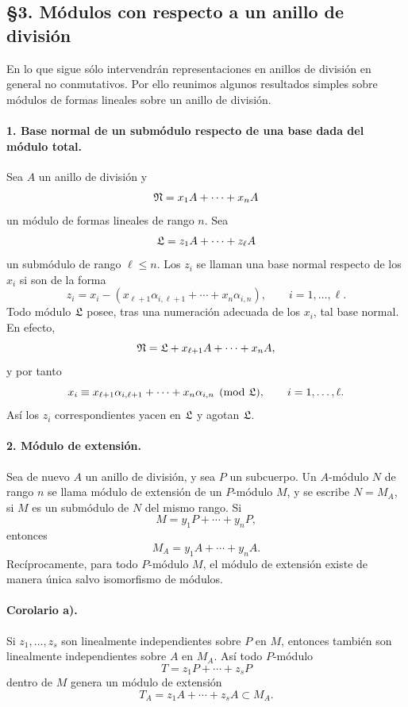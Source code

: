 \subsection*{§3. Módulos con respecto a un anillo de división}

En lo que sigue sólo intervendrán representaciones en anillos de división en general no conmutativos. Por ello reunimos algunos resultados simples sobre módulos de formas lineales sobre un anillo de división.

\paragraph{1. Base normal de un submódulo respecto de una base dada del módulo total.}
Sea \(A\) un anillo de división y
\[
        \mathfrak N=x_1A+\cdots+x_nA
\]
un módulo de formas lineales de rango \(n\). Sea
\[
        \mathfrak L=z_1A+\cdots+z_\ell A
\]
un submódulo de rango \(\ell\le n\). Los \(z_i\) se llaman una base normal respecto de los \(x_i\) si son de la forma
\[
        z_i=x_i-(x_{\ell+1}\alpha_{i,\ell+1}+\cdots+x_n\alpha_{i,n}),
        \qquad i=1,\ldots,\ell.
\]
Todo módulo \(\mathfrak L\) posee, tras una numeración adecuada de los \(x_i\), tal base normal. En efecto,
\[
        \mathfrak N=\mathfrak L+x_{\ell+1}A+\cdots+x_nA,
\]
y por tanto
\[
        x_i\equiv x_{\ell+1}\alpha_{i,\ell+1}+\cdots+x_n\alpha_{i,n}
        \pmod{\mathfrak L},\qquad i=1,\ldots,\ell.
\]
Así los \(z_i\) correspondientes yacen en \(\mathfrak L\) y agotan \(\mathfrak L\).

\paragraph{2. Módulo de extensión.}
Sea de nuevo \(A\) un anillo de división, y sea \(P\) un subcuerpo. Un \(A\)-módulo \(N\) de rango \(n\) se llama módulo de extensión de un \(P\)-módulo \(M\), y se escribe \(N=M_A\), si \(M\) es un submódulo de \(N\) del mismo rango. Si
\[
        M=y_1P+\cdots+y_nP,
\]
entonces
\[
        M_A=y_1A+\cdots+y_nA.
\]
Recíprocamente, para todo \(P\)-módulo \(M\), el módulo de extensión existe de manera única salvo isomorfismo de módulos.

\paragraph{Corolario a).}
Si \(z_1,\ldots,z_s\) son linealmente independientes sobre \(P\) en \(M\), entonces también son linealmente independientes sobre \(A\) en \(M_A\). Así todo \(P\)-módulo
\[
        T=z_1P+\cdots+z_sP
\]
dentro de \(M\) genera un módulo de extensión
\[
        T_A=z_1A+\cdots+z_sA\subset M_A.
\]

